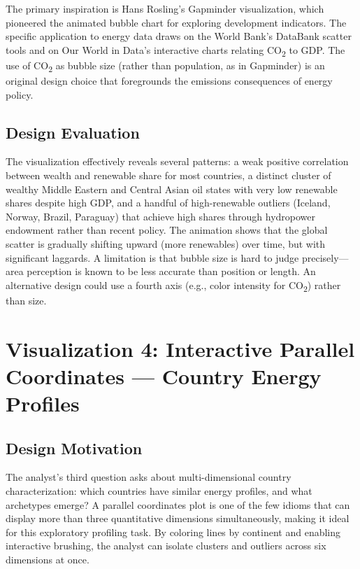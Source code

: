 \documentclass[10pt]{article}
\begin{document}
The primary inspiration is Hans Rosling's Gapminder visualization, which pioneered the animated bubble chart for exploring development indicators. The specific application to energy data draws on the World Bank's DataBank scatter tools and on Our World in Data's interactive charts relating CO\textsubscript{2} to GDP. The use of CO\textsubscript{2} as bubble size (rather than population, as in Gapminder) is an original design choice that foregrounds the emissions consequences of energy policy.

\subsection{Design Evaluation}

The visualization effectively reveals several patterns: a weak positive correlation between wealth and renewable share for most countries, a distinct cluster of wealthy Middle Eastern and Central Asian oil states with very low renewable shares despite high GDP, and a handful of high-renewable outliers (Iceland, Norway, Brazil, Paraguay) that achieve high shares through hydropower endowment rather than recent policy. The animation shows that the global scatter is gradually shifting upward (more renewables) over time, but with significant laggards. A limitation is that bubble size is hard to judge precisely---area perception is known to be less accurate than position or length. An alternative design could use a fourth axis (e.g., color intensity for CO\textsubscript{2}) rather than size.


\section{Visualization 4: Interactive Parallel Coordinates --- Country Energy Profiles}
\label{sec:viz4}

\subsection{Design Motivation}

The analyst's third question asks about multi-dimensional country characterization: which countries have similar energy profiles, and what archetypes emerge? A parallel coordinates plot is one of the few idioms that can display more than three quantitative dimensions simultaneously, making it ideal for this exploratory profiling task. By coloring lines by continent and enabling interactive brushing, the analyst can isolate clusters and outliers across six dimensions at once.
\end{document}
